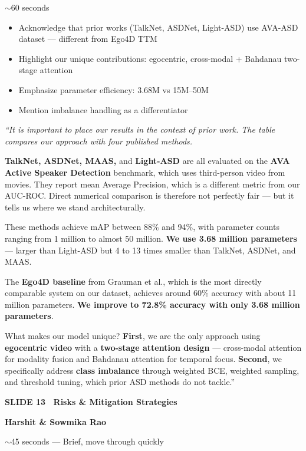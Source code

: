 \documentclass[11pt, a4paper]{article}
\newcommand{\slideheading}[3]{%
  \vspace{0.6cm}
  \begin{tcolorbox}[slidebox]
    \textbf{\color{NavyBlue}SLIDE #1 \textemdash\ #2}\\[2pt]
    \begin{tcolorbox}[presenterbox, title=Presenter(s)]
      \color{AccBlue}\bfseries #3
    \end{tcolorbox}
  \end{tcolorbox}
}
\newcommand{\timing}[1]{%
  \begin{tcolorbox}[timebox, title=Suggested Time]
    \color{AccOrange} #1
  \end{tcolorbox}
}
\newcommand{\keypoints}[1]{%
  \begin{tcolorbox}[keybox, title=Key Points to Cover]
    #1
  \end{tcolorbox}
}
\newcommand{\script}[1]{%
  \begin{mdframed}[
    backgroundcolor=white,
    linecolor=MidText!40,
    linewidth=0.5pt,
    leftmargin=0pt,
    rightmargin=0pt,
    innerleftmargin=10pt,
    innerrightmargin=8pt,
    innertopmargin=8pt,
    innerbottommargin=8pt,
    roundcorner=3pt
  ]
  \itshape\color{MidText}
  #1
  \end{mdframed}
}
\begin{document}
\timing{$\sim$60 seconds}

\keypoints{%
\begin{itemize}[leftmargin=*, itemsep=2pt]
  \item Acknowledge that prior works (TalkNet, ASDNet, Light-ASD) use AVA-ASD dataset --- different from Ego4D TTM
  \item Highlight our unique contributions: egocentric, cross-modal + Bahdanau two-stage attention
  \item Emphasize parameter efficiency: 3.68M vs 15M--50M
  \item Mention imbalance handling as a differentiator
\end{itemize}
}

\script{%
``It is important to place our results in the context of prior work. The table compares our approach with four published methods.

\textbf{TalkNet, ASDNet, MAAS,} and \textbf{Light-ASD} are all evaluated on the \textbf{AVA Active Speaker Detection} benchmark, which uses third-person video from movies. They report mean Average Precision, which is a different metric from our AUC-ROC. Direct numerical comparison is therefore not perfectly fair --- but it tells us where we stand architecturally.

These methods achieve mAP between 88\% and 94\%, with parameter counts ranging from 1 million to almost 50 million. \textbf{We use 3.68 million parameters} --- larger than Light-ASD but 4 to 13 times smaller than TalkNet, ASDNet, and MAAS.

The \textbf{Ego4D baseline} from Grauman et al., which is the most directly comparable system on our dataset, achieves around 60\% accuracy with about 11 million parameters. \textbf{We improve to 72.8\% accuracy with only 3.68 million parameters}.

What makes our model unique? \textbf{First}, we are the only approach using \textbf{egocentric video} with a \textbf{two-stage attention design} --- cross-modal attention for modality fusion and Bahdanau attention for temporal focus. \textbf{Second}, we specifically address \textbf{class imbalance} through weighted BCE, weighted sampling, and threshold tuning, which prior ASD methods do not tackle.''
}

\slideheading{13}{Risks \& Mitigation Strategies}{Harshit \& Sowmika Rao}

\timing{$\sim$45 seconds --- Brief, move through quickly}
\end{document}
